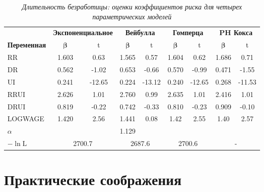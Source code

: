     \begin{table}[!htbp]\caption{\textit{Длительность безработицы: оценки коэффициентов риска для четырех параметрических моделей}}\label{tab:17.9}
    \begin{center}
\begin{tabular}{lcccccccc}
\hline \hline
&\multicolumn{2}{c}{\textbf{Экспоненциальное}}&\multicolumn{2}{c}{\textbf{Вейбулла}}&\multicolumn{2}{c}{\textbf{Гомперца}}&\multicolumn{2}{c}{\textbf{PH Кокса}}\\
\cmidrule(r){2-3}\cmidrule(r){4-5}\cmidrule(r){6-7}\cmidrule(r){8-9}
\textbf{Переменная} &$\bm{\beta}$ &t      &$\bm{\beta}$ &t      &$\bm{\beta}$ &t      &$\bm{\beta}$ &t\\
\hline
RR                  &1.603  &0.63   &1.565  &0.57   &1.604  &0.62   &1.686  &0.71\\
DR                  &0.562  &-1.02  &0.653  &-0.66  &0.570  &-0.99  &0.471  &-1.55\\
UI                  &0.241  &-12.65 &0.224  &-13.12 &0.240  &-12.65 &0.268  &-11.53\\
RRUI                &2.626  &1.01   &2.760  &0.99   &2.635  &1.01   &2.416  &1.01\\
DRUI                &0.819  &-0.22  &0.742  &-0.33  &0.810  &-0.23  &0.909  &-0.10\\
LOGWAGE             &1.420  &2.56   &1.441  &0.08   &1.42   &2.55   &1.40   &2.57\\
$\alpha$            &       &       &1.129  &&&&&\\
$-\ln\textrm{L}$    &\multicolumn{2}{c}{2700.7}&\multicolumn{2}{c}{2687.6}&\multicolumn{2}{c}{2700.6}&\multicolumn{2}{c}{-}\\
\hline \hline
\end{tabular}
    \end{center}
    \end{table}



\section{Практические соображения}\label{sec:17.12}

